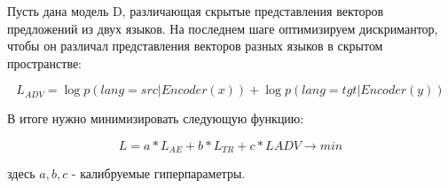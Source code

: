 \documentclass[12pt,twoside]{article}
\begin{document}
Пусть дана модель D, различающая скрытые представления векторов предложений из двух языков. На последнем шаге оптимизируем дискримантор, чтобы он различал представления векторов разных языков в скрытом пространстве:

$$L_{ADV} = \log p(lang = src| Encoder(x)) + \log p(lang = tgt|Encoder(y))$$

В итоге нужно минимизировать следующую функцию:

$$L = a*L_{AE} + b*L_{TR}+c*L{ADV} \longrightarrow min$$

здесь $a,b,c$ - калибруемые гиперпараметры.











\end{document}
